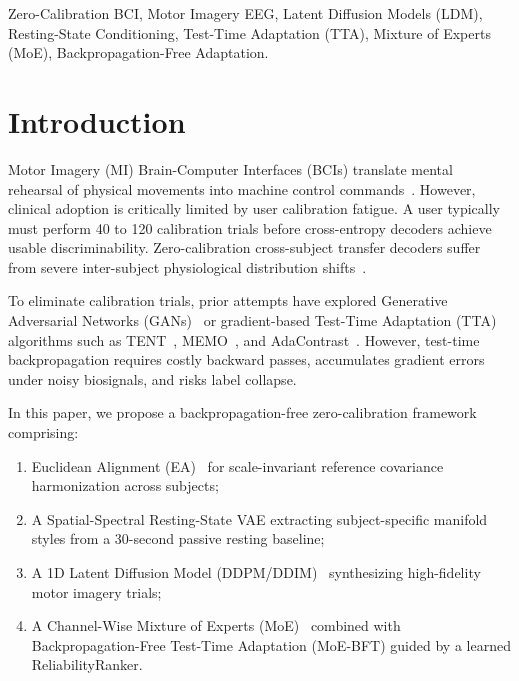 \documentclass[journal,10pt]{IEEEtran}
\begin{document}
\begin{IEEEkeywords}
Zero-Calibration BCI, Motor Imagery EEG, Latent Diffusion Models (LDM), Resting-State Conditioning, Test-Time Adaptation (TTA), Mixture of Experts (MoE), Backpropagation-Free Adaptation.
\end{IEEEkeywords}

\section{Introduction}
Motor Imagery (MI) Brain-Computer Interfaces (BCIs) translate mental rehearsal of physical movements into machine control commands~\cite{lotte2018review, saha2020progress}. However, clinical adoption is critically limited by user calibration fatigue. A user typically must perform 40 to 120 calibration trials before cross-entropy decoders achieve usable discriminability. Zero-calibration cross-subject transfer decoders suffer from severe inter-subject physiological distribution shifts~\cite{lawhern2018eegnet, altaheri2022physics}.

To eliminate calibration trials, prior attempts have explored Generative Adversarial Networks (GANs)~\cite{saha2020progress} or gradient-based Test-Time Adaptation (TTA) algorithms such as TENT~\cite{wang2020tent}, MEMO~\cite{zhang2022memo}, and AdaContrast~\cite{chen2022contrastive}. However, test-time backpropagation requires costly backward passes, accumulates gradient errors under noisy biosignals, and risks label collapse.

In this paper, we propose a backpropagation-free zero-calibration framework comprising:
\begin{enumerate}
    \item Euclidean Alignment (EA)~\cite{he2020transfer} for scale-invariant reference covariance harmonization across subjects;
    \item A Spatial-Spectral Resting-State VAE extracting subject-specific manifold styles from a 30-second passive resting baseline;
    \item A 1D Latent Diffusion Model (DDPM/DDIM)~\cite{ho2020denoising, song2020denoising, rombach2022high} synthesizing high-fidelity motor imagery trials;
    \item A Channel-Wise Mixture of Experts (MoE)~\cite{shazeer2017outrageously, fedus2022switch} combined with Backpropagation-Free Test-Time Adaptation (MoE-BFT) guided by a learned ReliabilityRanker.
\end{enumerate}
\end{document}

